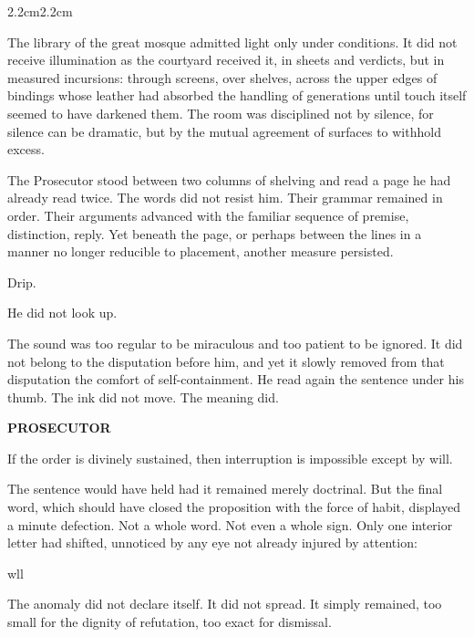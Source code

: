 \begin{adjustwidth}{2.2cm}{2.2cm}

The library of the great mosque admitted light only under conditions. It did not
receive illumination as the courtyard received it, in sheets and verdicts, but in
measured incursions: through screens, over shelves, across the upper edges of
bindings whose leather had absorbed the handling of generations until touch itself
seemed to have darkened them. The room was disciplined not by silence, for silence
can be dramatic, but by the mutual agreement of surfaces to withhold excess.

The Prosecutor stood between two columns of shelving and read a page he had
already read twice. The words did not resist him. Their grammar remained in order.
Their arguments advanced with the familiar sequence of premise, distinction, reply.
Yet beneath the page, or perhaps between the lines in a manner no longer reducible
to placement, another measure persisted.

\medskip

Drip.

\medskip

He did not look up.

The sound was too regular to be miraculous and too patient to be ignored. It did not
belong to the disputation before him, and yet it slowly removed from that disputation
the comfort of self-containment. He read again the sentence under his thumb. The
ink did not move. The meaning did.

\medskip

\textbf{PROSECUTOR}

If the order is divinely sustained, then interruption is impossible except by will.

\medskip

The sentence would have held had it remained merely doctrinal. But the final word,
which should have closed the proposition with the force of habit, displayed a minute
defection. Not a whole word. Not even a whole sign. Only one interior letter had
shifted, unnoticed by any eye not already injured by attention:

\medskip

\begin{center}
wll
\end{center}

\medskip

The anomaly did not declare itself. It did not spread. It simply remained, too small
for the dignity of refutation, too exact for dismissal.


\end{adjustwidth}
